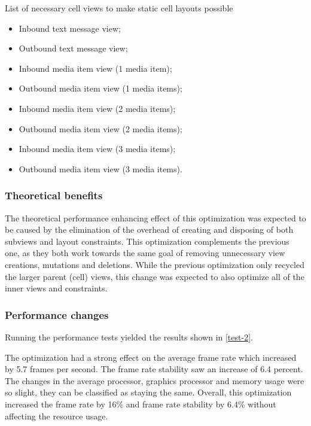 \documentclass[a4paper,12pt]{article}
\begin{document}
\begin{listing}[H]
  \caption{List of necessary cell views to make static cell layouts possible}
  \label{lst:static-layout-cell-views}
  \begin{itemize}
    \item Inbound text message view;
    \item Outbound text message view;
    \item Inbound media item view (1 media item);
    \item Outbound media item view (1 media items);
    \item Inbound media item view (2 media items);
    \item Outbound media item view (2 media items);
    \item Inbound media item view (3 media items);
    \item Outbound media item view (3 media items).
  \end{itemize}
\end{listing}

\subsubsection{Theoretical benefits}
The theoretical performance enhancing effect of this optimization was expected to be caused by the elimination of the overhead of creating and disposing of both subviews and layout constraints. This optimization complements the previous one, as they both work towards the same goal of removing unnecessary view creations, mutations and deletions. While the previous optimization only recycled the larger parent (cell) views, this change was expected to also optimize all of the inner views and constraints.

\subsubsection{Performance changes}
Running the performance tests yielded the results shown in \autoref{test-2}.

The optimization had a strong effect on the average frame rate which increased by 5.7 frames per second. The frame rate stability saw an increase of 6.4 percent. The changes in the average processor, graphics processor and memory usage were so slight, they can be classified as staying the same. Overall, this optimization increased the frame rate by 16\% and frame rate stability by 6.4\% without affecting the resource usage.
\end{document}

